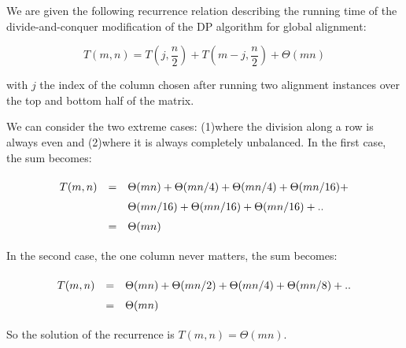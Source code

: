 
We are given the following recurrence relation describing the running time of the divide-and-conquer modification of the DP algorithm for global alignment:

\[
  T(m, n) = T(j, \frac{n}{2}) + T(m - j, \frac{n}{2}) + \Theta(mn)
\]

\noindent
with $j$ the index of the column chosen after running two alignment instances over the top and bottom half of the matrix.

We can consider the two extreme cases: (1)where the division along a row is always even and (2)where it is always completely unbalanced. In the first case, the sum becomes:

\[\def\arraystretch{1.5}
\begin{array}{l l l}
  T(m, n) & = & \Theta(mn) + \Theta(mn/4) + \Theta(mn/4) + \Theta(mn/16) +\\
          &   & \Theta(mn/16) + \Theta(mn/16) + \Theta(mn/16) + ..  \\
          & = & \Theta(mn)
\end{array}
\]

In the second case, the one column never matters, the sum becomes:

\[\def\arraystretch{1.5}
\begin{array}{l l l}
  T(m, n) & = & \Theta(mn) + \Theta(mn/2) + \Theta(mn/4) + \Theta(mn/8) + ..  \\
          & = & \Theta(mn)
\end{array}
\]

So the solution of the recurrence is $T(m, n) = \Theta(mn)$.
